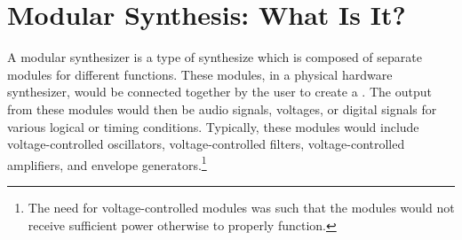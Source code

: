 \section[Modular Synthesis: What Is It?]{Modular Synthesis: What Is It?}\label{modular-synth-what-is}

A modular synthesizer is a type of synthesize which is composed of separate modules for different functions. These modules, in a physical hardware synthesizer, would be connected together by the user to create a . The output from these modules would then be audio signals, voltages, or digital signals for various logical or timing conditions. Typically, these modules would include voltage-controlled oscillators, voltage-controlled filters, voltage-controlled amplifiers, and envelope generators.\footnote{The need for voltage-controlled modules was such that the modules would not receive sufficient power otherwise to properly function.}